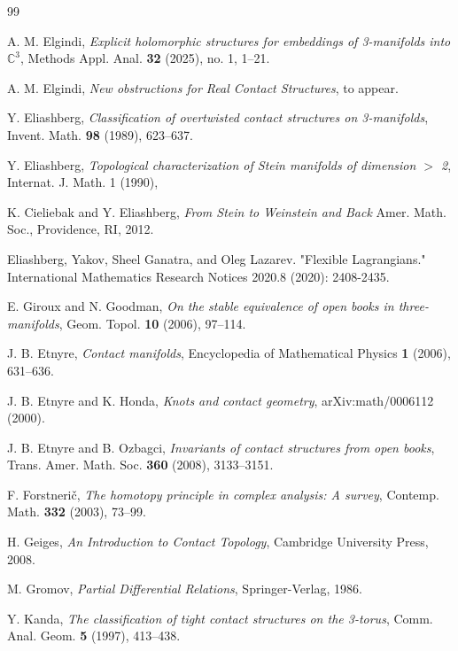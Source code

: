 \documentclass{amsart}
\newcommand{\C}{\mathbb{C}}
\begin{document}
\newpage
\begin{thebibliography}{99}


A. M. Elgindi,
\textit{Explicit holomorphic structures for embeddings of 3-manifolds into $\C^3$},
Methods Appl. Anal. \textbf{32} (2025), no. 1, 1–21.

A. M. Elgindi,
\textit{New obstructions for Real Contact Structures},
to appear.

Y. Eliashberg,
\textit{Classification of overtwisted contact structures on 3-manifolds},
Invent. Math. \textbf{98} (1989), 623–637.

 Y. Eliashberg, 
\textit{Topological characterization of Stein manifolds of dimension $>$ 2}, Internat. J. Math. {1} (1990),

K. Cieliebak and Y. Eliashberg, \textit{From Stein to Weinstein and Back} Amer. Math. Soc., Providence, RI, 2012. 

 Eliashberg, Yakov, Sheel Ganatra, and Oleg Lazarev. "Flexible Lagrangians." International Mathematics Research Notices 2020.8 (2020): 2408-2435.

E. Giroux and N. Goodman,
\textit{On the stable equivalence of open books in three-manifolds},
Geom. Topol. \textbf{10} (2006), 97–114.

J. B. Etnyre,
\textit{Contact manifolds},
Encyclopedia of Mathematical Physics \textbf{1} (2006), 631–636.

J. B. Etnyre and K. Honda,
\textit{Knots and contact geometry},
arXiv:math/0006112 (2000).

J. B. Etnyre and B. Ozbagci,
\textit{Invariants of contact structures from open books},
Trans. Amer. Math. Soc. \textbf{360} (2008), 3133–3151.

F. Forstneri\v{c},
\textit{The homotopy principle in complex analysis: A survey},
Contemp. Math. \textbf{332} (2003), 73–99.

H. Geiges,
\textit{An Introduction to Contact Topology},
Cambridge University Press, 2008.

M. Gromov,
\textit{Partial Differential Relations},
Springer-Verlag, 1986.

Y. Kanda,
\textit{The classification of tight contact structures on the 3-torus},
Comm. Anal. Geom. \textbf{5} (1997), 413–438.


\end{thebibliography}
\end{document}
